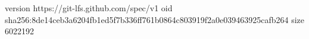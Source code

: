 version https://git-lfs.github.com/spec/v1
oid sha256:8de14ceb3a6204fb1ed5f7b336ff761b0864c803919f2a0e039463925cafb264
size 6022192
